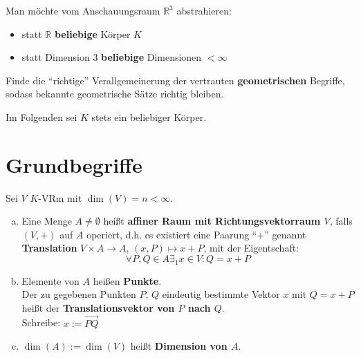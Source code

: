 \documentclass[parskip,a4paper,twoside,DIV15,BCOR12mm]{scrbook}
\begin{document}
Man möchte vom Anschauungsraum $\mathbb{R}^3$ abstrahieren:
\begin{itemize}
\item statt $\mathbb{R}$ \textbf{beliebige} Körper $K$
\item statt Dimension $3$ \textbf{beliebige} Dimensionen $< \infty$
\end{itemize}

\begin{task}
Finde die "`richtige"' Verallgemeinerung der vertrauten \textbf{geometrischen} 
Begriffe, sodass bekannte geometrische Sätze richtig bleiben.
\end{task}

Im Folgenden sei $K$ stets ein beliebiger Körper.

\section{Grundbegriffe}
\begin{definition}
Sei $V$ $K$-VRm mit $\dim(V)=n<\infty$.
\begin{enumerate}[(a)]
\item Eine Menge $A \ne \emptyset$ heißt \textbf{affiner Raum mit Richtungsvektorraum $V$},
falls $(V,+)$ auf $A$ operiert, d.h. es existiert eine Paarung "`$+$"' genannt
\textbf{Translation} $V \times A \to A$, $(x,P) \mapsto x+P$, mit der Eigentschaft:
\[\forall P,Q\in A\exists_1 x\in V: Q=x+P\]
\item Elemente von $A$ heißen \textbf{Punkte}.\\
Der zu gegebenen Punkten $P$, $Q$ eindeutig bestimmte Vektor $x$ mit $Q=x+P$ heißt
der \textbf{Translationsvektor von $P$ nach $Q$}.\\
Schreibe: $x:=\overrightarrow{PQ}$
\item $\dim(A) := \dim(V)$ heißt \textbf{Dimension von $A$}.
\end{enumerate}
\end{definition}

\begin{comment}
\begin{enumerate}
\item Vorsicht in (1) wird das Zeichen "`+"' für verschiedene Verknüpfungen benutzt.
\item Es gilt für $P,Q,R,\in A:$
\begin{align*}
\overrightarrow{PP}&=0\\
\overrightarrow{PQ}+\overrightarrow{QR} &= \overrightarrow{PR}\\
\overrightarrow{QP}&=-\overrightarrow{PQ}
\end{align*} 
\item $A$ besteht aus genau einer Bahn:
\[\forall P\in A: A=V+P:=\{x+P\mid x\in V\}\]
\end{enumerate}
\end{comment}
\end{document}
